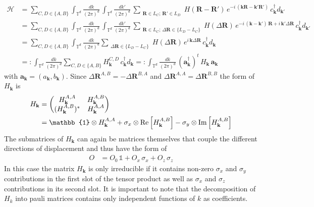 \begin{align*}
    \mathcal{H} &=\sum_{C,D\in\{A,B\}}\int_{\mathbb{T}^d}\frac{dk}{(2\pi)^d}\,\int_{\mathbb{T}^d}\frac{dk'}{(2\pi)^d}\,  \sum_{\substack{\mathbf{R}\in L_C;\,\mathbf{R}'\in L_D}}H(\mathbf{R}-\mathbf{R}')\,e^{-i\,(\mathbf{k}\mathbf{R}-\mathbf{k}'\mathbf{R}')}\, c_{\mathbf{k}}^{\dagger} d_{\mathbf{k}'}\\
    &=\sum_{C,D\in\{A,B\}}\int_{\mathbb{T}^d}\frac{dk}{(2\pi)^d}\,\int_{\mathbb{T}^d}\frac{dk'}{(2\pi)^d}\,  \sum_{\substack{\mathbf{R}\in L_C;\,\Delta\mathbf{R}\in\{ L_D-L_C\}}}H(\Delta\mathbf{R})\,e^{-i\,(\mathbf{k}-\mathbf{k}')\,\mathbf{R}+i\,\mathbf{k}'\Delta\mathbf{R}}\, c_{\mathbf{k}}^{\dagger} d_{\mathbf{k}'}\\
    &=\sum_{C,D\in\{A,B\}}\int_{\mathbb{T}^d}\frac{dk}{(2\pi)^d} \sum_{\substack{\Delta\mathbf{R}\in\{ L_D-L_C\}}}H(\Delta\mathbf{R})\,e^{i\,\mathbf{k}\Delta\mathbf{R}}\, c_{\mathbf{k}}^{\dagger} d_{\mathbf{k}}\\
    &=:\int_{\mathbb{T}^d}\frac{dk}{(2\pi)^d}\sum_{C,D\in\{A,B\}} H_\mathbf{k}^{C,D}\, c_{\mathbf{k}}^{\dagger} d_{\mathbf{k}}=:\int_{\mathbb{T}^d}\frac{dk}{(2\pi)^d}\, (\mathbf{a}_{\mathbf{k}}^\dagger)^t\,H_\mathbf{k}\,\mathbf{a}_{\mathbf{k}}
\end{align*}
with $\mathbf{a}_\mathbf{k}=(a_\mathbf{k},b_\mathbf{k})$. 
Since $\Delta\mathbf{R}^{A,B}=-\Delta\mathbf{R}^{B,A}$ and $\Delta\mathbf{R}^{A,A}=\Delta\mathbf{R}^{B,B}$ the form of $H_\mathbf{k}$ is 
\begin{align}\label{eq:H_k decomposition}
    H_\mathbf{k}&=\begin{pmatrix}
        H_\mathbf{k}^{A,A} & H_\mathbf{k}^{A,B}\\
        (H_\mathbf{k}^{A,B})^* & H_\mathbf{k}^{A,A}
    \end{pmatrix}\notag\\
    &=\mathbb{1}\otimes H_\mathbf{k}^{A,A} + \sigma_x\otimes\text{Re}\left[ H_\mathbf{k}^{A,B} \right]-\sigma_y\otimes\text{Im}\left[ H_\mathbf{k}^{A,B} \right]
\end{align}
The submatrices of $H_\mathbf{k}$ can again be matrices themselves that couple the different directions of displacement and thus have the form of
\begin{align}\label{eq:xy-decomposition}
    O &= O_0\,\mathbb{1}+ O_x\,\sigma_x+ O_z\,\sigma_z
\end{align}
In this case the matrix $H_\mathbf{k}$ is only irreducible if it contains non-zero $\sigma_x$ and $\sigma_y$ contributions in the first slot of the tensor product as well as $\sigma_x$ and $\sigma_z$ contributions in its second slot.
It is important to note that the decomposition of $H_k$ into pauli matrices contains only independent functions of $k$ as coefficients.
